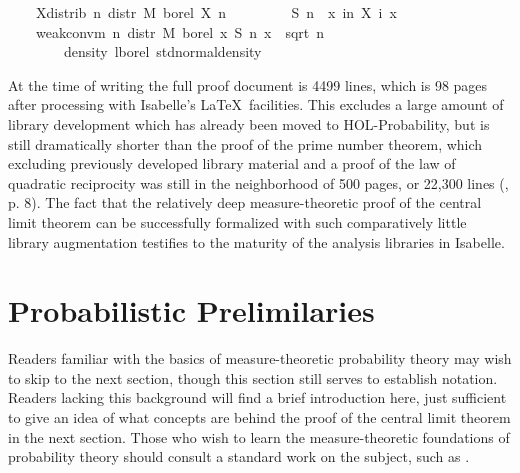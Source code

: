 \documentclass[leqno]{article}
\theoremstyle{definition}
\begin{document}
\begin{isabellebody}
\ \ \ \ X{\isacharunderscore}distrib{\isacharcolon}\ {\isachardoublequoteopen}{\isasymAnd}n{\isachardot}\ distr\ M\ borel\ {\isacharparenleft}X\ n{\isacharparenright}\ {\isacharequal}\ {\isasymmu}{\isachardoublequoteclose}\isanewline
\ \ \isanewline
\ \ \ \ {\isachardoublequoteopen}S\ n\ {\isasymequiv}\ {\isasymlambda}x{\isachardot}\ {\isasymSum}i{\isacharless}n{\isachardot}\ X\ i\ x{\isachardoublequoteclose}\isanewline
\ \ \isanewline
\ \ \ \ {\isachardoublequoteopen}weak{\isacharunderscore}conv{\isacharunderscore}m\ {\isacharparenleft}{\isasymlambda}n{\isachardot}\ distr\ M\ borel\ {\isacharparenleft}{\isasymlambda}x{\isachardot}\ S\ n\ x\ {\isacharslash}\ sqrt\ {\isacharparenleft}n\ {\isacharasterisk}\ {\isasymsigma}\ \isanewline
\ \ \ \ \ \ \ \ {\isacharparenleft}density\ lborel\ std{\isacharunderscore}normal{\isacharunderscore}density{\isacharparenright}{\isachardoublequoteclose}
\end{isabellebody}

\medskip

At the time of writing the full proof document is 4499 lines, which is 98 pages after processing with Isabelle's \LaTeX\ facilities. This excludes a large amount of library development which has already been moved to HOL-Probability, but is still dramatically shorter than the proof of the prime number theorem, which excluding previously developed library material and a proof of the law of quadratic reciprocity was still in the neighborhood of 500 pages, or 22,300 lines \linebreak (\cite{avigad-etal-pnt}, p. 8). The fact that the relatively deep measure-theoretic proof of the central limit theorem can be successfully formalized with such comparatively little library augmentation testifies to the maturity of the analysis libraries in Isabelle.

\section{Probabilistic Prelimilaries} \label{sec:prelim}

Readers familiar with the basics of measure-theoretic probability theory may wish to skip to the next section, though this section still serves to establish notation. Readers lacking this background will find a brief introduction here, just sufficient to give an idea of what concepts are behind the proof of the central limit theorem in the next section. Those who wish to learn the measure-theoretic foundations of probability theory should consult a standard work on the subject, such as \cite{billingsley}.
\end{document}
